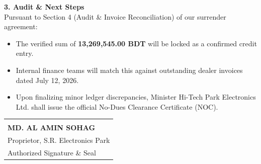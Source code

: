 \documentclass[11pt, a4paper]{article}
\begin{document}
\vspace{10pt}

\textbf{3. Audit \& Next Steps}\\[4pt]
Pursuant to Section 4 (Audit \& Invoice Reconciliation) of our surrender agreement:
\begin{itemize}
    \item The verified sum of \textbf{13,269,545.00 BDT} will be locked as a confirmed credit entry.
    \item Internal finance teams will match this against outstanding dealer invoices dated July 12, 2026.
    \item Upon finalizing minor ledger discrepancies, Minister Hi-Tech Park Electronics Ltd. shall issue the official No-Dues Clearance Certificate (NOC).
\end{itemize}

\vspace{40pt}

\noindent
\begin{tabular}{@{}p{8cm}@{}}
    \dotfill \\
    \textbf{MD. AL AMIN SOHAG} \\
    Proprietor, S.R. Electronics Park \\
    Authorized Signature \& Seal
\end{tabular}
\end{document}
